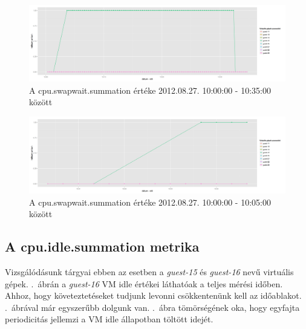 \documentclass[a4paper,10pt,titlepage]{article}
\begin{document}
\begin{figure}[ht!]
\centering
\includegraphics[width=1.00\textwidth]{figures/cpu_swapwait_summation-20120827100000-20120827103500.png}
\caption{A cpu.swapwait.summation értéke 2012.08.27. 10:00:00 - 10:35:00 között \label{fig:cpu_swapwait_summation_082701}}
\end{figure}

\begin{figure}[ht!]
\centering
\includegraphics[width=1.00\textwidth]{figures/cpu_swapwait_summation-20120827100000-20120827100500.png}
\caption{A cpu.swapwait.summation értéke 2012.08.27. 10:00:00 - 10:05:00 között \label{fig:cpu_swapwait_summation_082702}}
\end{figure}

\subsection{A cpu.idle.summation metrika}

Vizsgálódásunk tárgyai ebben az esetben a \textit{guest-15} és \textit{guest-16} nevű virtuális gépek. .~ábrán a \textit{guest-16} VM idle értékei láthatóak a teljes mérési időben. Ahhoz, hogy követeztetéseket tudjunk levonni csökkentenünk kell az időablakot. .~ábrával már egyszerűbb dolgunk van. .~ábra tömörségének oka, hogy egyfajta periodicitás jellemzi a VM idle állapotban töltött idejét. 
\end{document}
